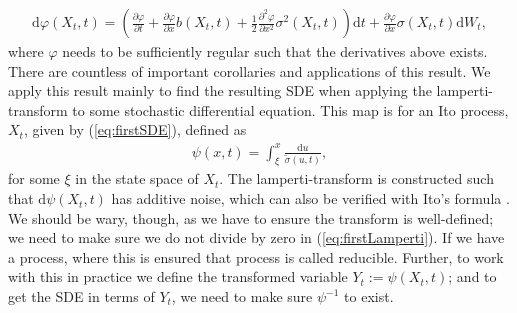 \begin{align}
    \mathrm{d}\varphi(X_t, t) = \left(\frac{\partial \varphi}{\partial t} + \frac{\partial\varphi}{\partial x}b(X_t, t) + \frac{1}{2} \frac{\partial^2 \varphi}{\partial x^2}\sigma^2(X_t, t) \right)\mathrm{d}t + \frac{\partial\varphi}{\partial x}\sigma(X_t, t) \mathrm{d}W_t, \label{eq:ItoFormula}
\end{align}
where $\varphi$ needs to be sufficiently regular such that the derivatives above exists. 
There are countless of important corollaries and applications of this result. We apply this result mainly to find the resulting SDE when applying the lamperti-transform to some stochastic differential equation. This map is for an Ito process, $X_t$, given by (\ref{eq:firstSDE}), defined as
\begin{align}
    \psi(x, t) = \int_{\xi}^x \frac{\mathrm{d}u}{\tilde{\sigma}(u, t)}, \label{eq:firstLamperti}
\end{align}
for some $\xi$ in the state space of $X_t$. The lamperti-transform is constructed such that $\mathrm{d}\psi(X_t, t)$ has additive noise, which can also be verified with Ito's formula \cite[equation (7.5)]{Srkk2019}. We should be wary, though, as we have to ensure the transform is well-defined; we need to make sure we do not divide by zero in (\ref{eq:firstLamperti}). If we have a process, where this is ensured that process is called reducible. Further, to work with this in practice we define the transformed variable $Y_t := \psi(X_t, t)$; and to get the SDE in terms of $Y_t$, we need to make sure $\psi^{-1}$ to exist.

